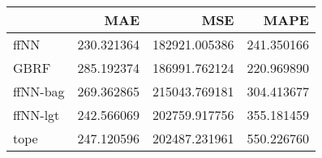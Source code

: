 \begin{tabular}{lrrr}
\toprule
{} &         MAE &            MSE &        MAPE \\
\midrule
ffNN     &  230.321364 &  182921.005386 &  241.350166 \\
GBRF     &  285.192374 &  186991.762124 &  220.969890 \\
ffNN-bag &  269.362865 &  215043.769181 &  304.413677 \\
ffNN-lgt &  242.566069 &  202759.917756 &  355.181459 \\
tope     &  247.120596 &  202487.231961 &  550.226760 \\
\bottomrule
\end{tabular}
